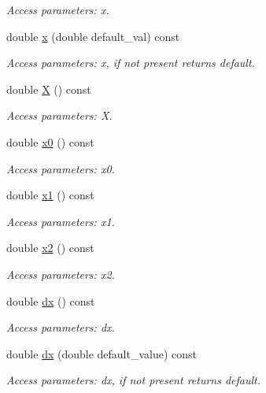 \begin{DoxyCompactItemize}
\begin{DoxyCompactList}\small\item\em Access parameters\+: x. \end{DoxyCompactList}\item 
double \hyperlink{struct_d_d4hep_1_1_x_m_l_1_1_child_value_aa1fb3f85121fb88892ee595139b67bc9}{x} (double default\+\_\+val) const
\begin{DoxyCompactList}\small\item\em Access parameters\+: x, if not present returns default. \end{DoxyCompactList}\item 
double \hyperlink{struct_d_d4hep_1_1_x_m_l_1_1_child_value_ad44885cf6fb82e76155c276b9f2bd8f3}{X} () const
\begin{DoxyCompactList}\small\item\em Access parameters\+: X. \end{DoxyCompactList}\item 
double \hyperlink{struct_d_d4hep_1_1_x_m_l_1_1_child_value_a3c4c3b0852c61d5df3bca9488d0b272a}{x0} () const
\begin{DoxyCompactList}\small\item\em Access parameters\+: x0. \end{DoxyCompactList}\item 
double \hyperlink{struct_d_d4hep_1_1_x_m_l_1_1_child_value_a34d587c99dec29da2ecd0cfd9fdb3fe6}{x1} () const
\begin{DoxyCompactList}\small\item\em Access parameters\+: x1. \end{DoxyCompactList}\item 
double \hyperlink{struct_d_d4hep_1_1_x_m_l_1_1_child_value_aa0d18183f1006617fe826438d9e4c060}{x2} () const
\begin{DoxyCompactList}\small\item\em Access parameters\+: x2. \end{DoxyCompactList}\item 
double \hyperlink{struct_d_d4hep_1_1_x_m_l_1_1_child_value_ae70f83d9a264ebd606622e5dd6ccc133}{dx} () const
\begin{DoxyCompactList}\small\item\em Access parameters\+: dx. \end{DoxyCompactList}\item 
double \hyperlink{struct_d_d4hep_1_1_x_m_l_1_1_child_value_a7500cb2eae5f90ee2f28608a75dc1789}{dx} (double default\+\_\+value) const
\begin{DoxyCompactList}\small\item\em Access parameters\+: dx, if not present returns default. \end{DoxyCompactList}\item 

\end{DoxyCompactItemize}
